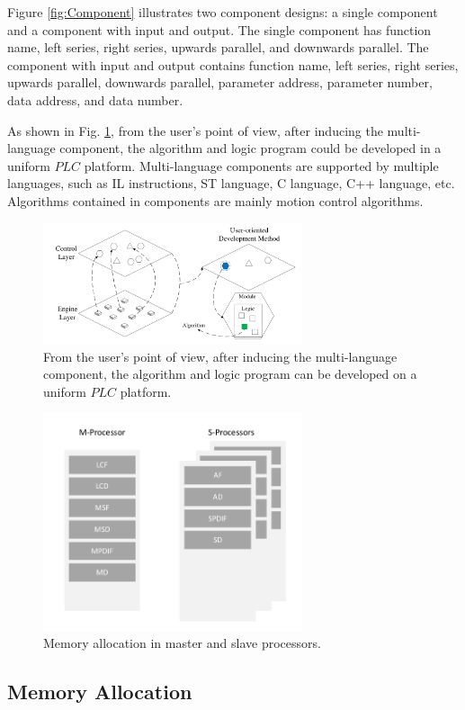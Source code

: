 \documentclass[journal,UTF8]{IEEEtran}
\begin{document}
	Figure \ref{fig:Component} illustrates two component designs: a single component and a component with input and output. The single component has function name, left series, right series, upwards parallel, and downwards parallel. The component with input and output contains function name, left series, right series, upwards parallel, downwards parallel, parameter address, parameter number, data address, and data number.
	
	As shown in Fig. \ref{fig:SoftwareStructure}, from the user's point of view, after inducing the multi-language component, the algorithm and logic program could be developed in a uniform $PLC$ platform. Multi-language components are supported by multiple languages, such as IL instructions, ST language, C language, C++ language, etc. Algorithms contained in components are mainly motion control algorithms.
	\begin{figure}
		\centering
		\includegraphics[width=3in]{fig/FIG3.pdf}
		\caption{ From the user's point of view, after inducing the multi-language component, the algorithm and logic program can be developed on a uniform $PLC$ platform.}
		\label{fig:SoftwareStructure}
	\end{figure}
	
	
	\begin{figure}
		\centering
		\includegraphics[width=3in]{fig/FIG4.pdf}
		\caption{ Memory allocation in master and slave processors.}
		\label{fig:Memory}
	\end{figure}
	
	\subsection{Memory Allocation}  
	
\end{document}
